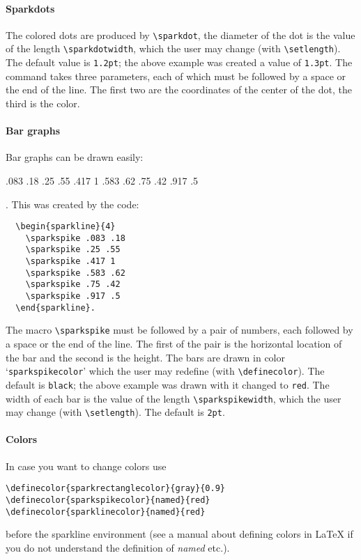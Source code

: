 \documentclass{article}
\begin{document}
\paragraph{Sparkdots}
The colored dots are produced by \verb$\sparkdot$, the diameter of the
dot is the value of the length \verb$\sparkdotwidth$, which the user may
change (with \verb$\setlength$). The default value is \texttt{1.2pt};
the above example was created a value of \texttt{1.3pt}. The command
takes three parameters, each of which must be followed by a space or the
end of the line. The first two are the coordinates of the center of the
dot, the third is the color.

\paragraph{Bar graphs}
Bar graphs can be drawn easily:
\begin{sparkline}{5}
\sparkspike .083 .18
\sparkspike .25 .55
\sparkspike .417 1
\sparkspike .583 .62
\sparkspike .75 .42
\sparkspike .917 .5
\end{sparkline}.
This was created by the code:
\begin{verbatim}
  \begin{sparkline}{4}
    \sparkspike .083 .18
    \sparkspike .25 .55
    \sparkspike .417 1
    \sparkspike .583 .62
    \sparkspike .75 .42
    \sparkspike .917 .5
  \end{sparkline}.
\end{verbatim}
The macro \verb$\sparkspike$ must be followed by a pair of numbers, each
followed by a space or the end of the line. The first of the pair is the
horizontal location of the bar and the second is the height. The bars
are drawn in color `\texttt{sparkspikecolor}' which the user may
redefine (with \verb$\definecolor$). The default is \texttt{black}; the
above example was drawn with it changed to \texttt{red}. The width of
each bar is the value of the length \verb$\sparkspikewidth$, which the
user may change (with \verb$\setlength$). The default is \texttt{2pt}.

\paragraph{Colors} In case you want to change colors use 
\begin{verbatim}
\definecolor{sparkrectanglecolor}{gray}{0.9}
\definecolor{sparkspikecolor}{named}{red}
\definecolor{sparklinecolor}{named}{red}
\end{verbatim}
before the sparkline environment (see a manual about defining colors in \LaTeX{} if you do not understand the definition of \emph{named} etc.).
\end{document}
